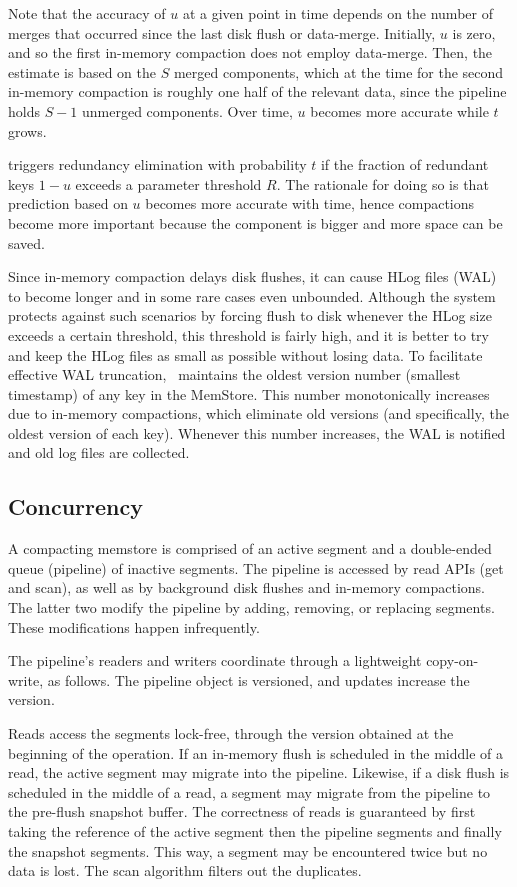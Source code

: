 Note that the accuracy of $u$ at a given point in time depends on the number of merges that occurred since the last disk flush
or data-merge.
Initially, $u$ is zero, and so the first in-memory compaction does not employ data-merge.
Then, the estimate is based on the $S$ merged components, which at the time for the second in-memory compaction
is roughly one half of the relevant data, since the pipeline holds $S-1$ unmerged components. 
Over time, $u$ becomes more accurate while $t$ grows. 

\adp\/ triggers redundancy elimination with probability $t$ if the fraction of redundant keys $1-u$ exceeds a parameter 
threshold $R$. The rationale for doing so is that prediction based on $u$ becomes more accurate with time, hence 
compactions become more important because the component is bigger and more space can be saved.

 Since in-memory compaction delays disk flushes, it can cause HLog files (WAL) to become longer
and in some rare cases even unbounded. 
Although the system protects against such scenarios by forcing flush to disk whenever the HLog size exceeds a certain threshold,
this threshold is fairly high, and it is better 
to try and keep the HLog files as small as possible without losing data. 
To facilitate effective WAL truncation, \sys\ maintains the oldest version number (smallest timestamp) of any key in the MemStore. 
This number monotonically increases  due to in-memory compactions, which eliminate old versions (and specifically, the oldest version
of each key). Whenever this number increases, the WAL is  notified and old log files are collected.

\subsection{Concurrency} \label{ssec:impl-details}

A compacting memstore is comprised of an active segment and a double-ended queue (pipeline) of inactive segments. 
The pipeline is accessed by read APIs (get and scan), as well as by background disk flushes and in-memory compactions. 
The latter two modify the pipeline by adding, removing, or replacing segments. These modifications happen infrequently.     

The pipeline's readers and writers coordinate through a lightweight copy-on-write, as follows.
The pipeline object is versioned, and updates increase the version.

Reads access the segments lock-free, through the version obtained at the beginning of the operation. 
If an in-memory flush is scheduled in the middle of a read, the active segment may migrate into the pipeline. 
Likewise, if a disk flush is scheduled in the middle of a read, a segment may migrate from the pipeline to the pre-flush snapshot buffer. 
The correctness of reads  is guaranteed by first taking the reference of the active segment then the pipeline segments and finally the snapshot segments. This way, a segment may be encountered twice but no data is 
lost. The scan algorithm filters out the duplicates. 

